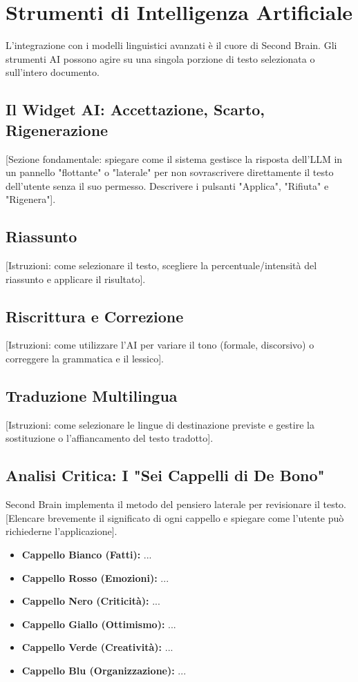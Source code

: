 \section{Strumenti di Intelligenza Artificiale}
L'integrazione con i modelli linguistici avanzati è il cuore di Second Brain. Gli strumenti AI possono agire su una singola porzione di testo selezionata o sull'intero documento.

\subsection{Il Widget AI: Accettazione, Scarto, Rigenerazione}
[Sezione fondamentale: spiegare come il sistema gestisce la risposta dell'LLM in un pannello "flottante" o "laterale" per non sovrascrivere direttamente il testo dell'utente senza il suo permesso. Descrivere i pulsanti "Applica", "Rifiuta" e "Rigenera"].

\subsection{Riassunto}
[Istruzioni: come selezionare il testo, scegliere la percentuale/intensità del riassunto e applicare il risultato].

\subsection{Riscrittura e Correzione}
[Istruzioni: come utilizzare l'AI per variare il tono (formale, discorsivo) o correggere la grammatica e il lessico].

\subsection{Traduzione Multilingua}
[Istruzioni: come selezionare le lingue di destinazione previste e gestire la sostituzione o l'affiancamento del testo tradotto].

\subsection{Analisi Critica: I "Sei Cappelli di De Bono"}
Second Brain implementa il metodo del pensiero laterale per revisionare il testo.
[Elencare brevemente il significato di ogni cappello e spiegare come l'utente può richiederne l'applicazione].
\begin{itemize}
    \item \textbf{Cappello Bianco (Fatti):} ...
    \item \textbf{Cappello Rosso (Emozioni):} ...
    \item \textbf{Cappello Nero (Criticità):} ...
    \item \textbf{Cappello Giallo (Ottimismo):} ...
    \item \textbf{Cappello Verde (Creatività):} ...
    \item \textbf{Cappello Blu (Organizzazione):} ...
\end{itemize}

